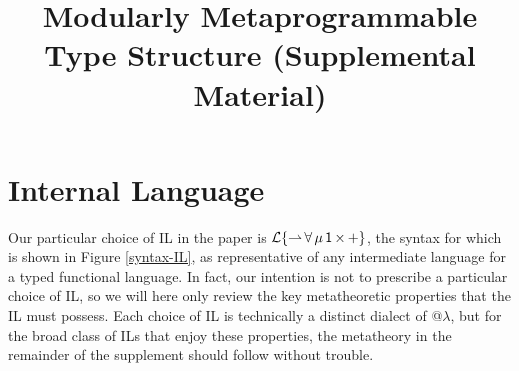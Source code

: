 \documentclass[12pt]{article}
\begin{document}

\title{Modularly Metaprogrammable Type Structure (Supplemental Material)}

\author{ }


\trnumber{ }

\maketitle


\tableofcontents 
\listoffigures

\newpage



\section{Internal Language}
Our particular choice of IL in the paper is {$\mathcal{L}\{{\rightharpoonup}\,{\forall}\,{\mu}\,{{\sf 1}}\,{\times}\,{+}\}$}, the syntax for which is shown in Figure \ref{syntax-IL}, as representative of any intermediate language for a typed functional language. In fact, our intention is not to prescribe a particular choice of IL, so we will here only review the key metatheoretic properties that the IL must possess. Each choice of IL is technically a distinct dialect of @$\lambda$, but for the broad class of ILs that enjoy these properties, the metatheory in the remainder of the supplement should follow without trouble.
\end{document}
